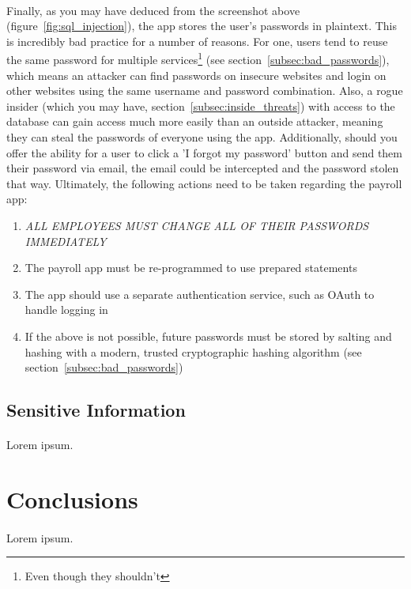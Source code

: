 \documentclass{article}
\begin{document}
\paragraph{}
Finally, as you may have deduced from the screenshot above (figure~\ref{fig:sql_injection}), the app stores the user's passwords in plaintext.
This is incredibly bad practice for a number of reasons.
For one, users tend to reuse the same password for multiple services\footnote{Even though they shouldn't} (see section~\ref{subsec:bad_passwords}), which means an attacker can find passwords on insecure websites and login on other websites using the same username and password combination.
Also, a rogue insider (which you may have, section~\ref{subsec:inside_threats}) with access to the database can gain access much more easily than an outside attacker, meaning they can steal the passwords of everyone using the app.
Additionally, should you offer the ability for a user to click a 'I forgot my password' button and send them their password via email, the email could be intercepted and the password stolen that way.
Ultimately, the following actions need to be taken regarding the payroll app:
\begin{enumerate}
	\item \emph{ALL EMPLOYEES MUST CHANGE ALL OF THEIR PASSWORDS IMMEDIATELY}
	\item The payroll app must be re-programmed to use prepared statements
	\item The app should use a separate authentication service, such as OAuth to handle logging in
	\item If the above is not possible, future passwords must be stored by salting and hashing with a modern, trusted cryptographic hashing algorithm (see section~\ref{subsec:bad_passwords})
\end{enumerate}

\subsection{Sensitive Information}
\label{subsec:sensitive_info}
\paragraph{}
Lorem ipsum.

\newpage

\section{Conclusions}
\label{sec:conclusions}
\paragraph{}
Lorem ipsum.
\end{document}
